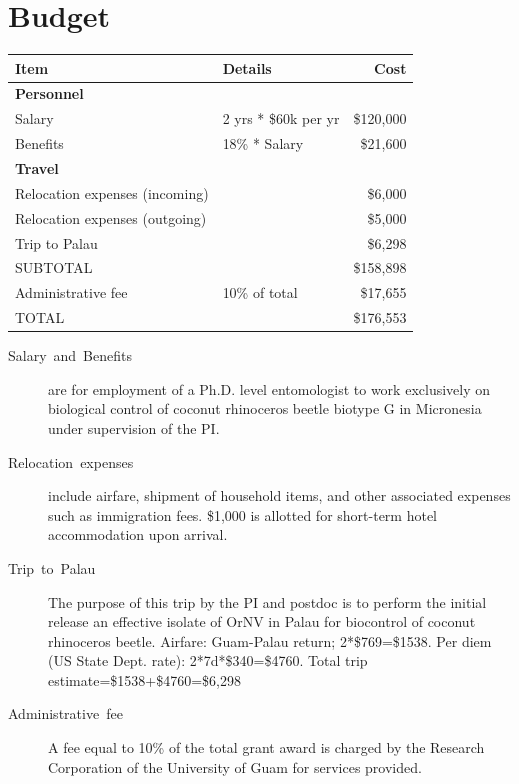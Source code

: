 \documentclass[12pt,letterpaper,english,bibliography=totocnumbered, abstract=on]{scrartcl}
\begin{document}
\section{Budget}
\begin{flushleft}
\begin{tabular}{llr}
\hline 
\textbf{Item} & \textbf{Details} & \textbf{Cost}\tabularnewline
\hline 
\textbf{Personnel} &  & \tabularnewline
Salary & 2 yrs {*} \$60k per yr & \$120,000\tabularnewline
Benefits & 18\% {*} Salary & \$21,600\tabularnewline
\textbf{Travel} &  & \tabularnewline
Relocation expenses (incoming) &  & \$6,000\tabularnewline
Relocation expenses (outgoing) &  & \$5,000\tabularnewline
Trip to Palau &  & \$6,298\tabularnewline
\hline 
SUBTOTAL &  & \$158,898\tabularnewline
Administrative fee & 10\% of total & \$17,655\tabularnewline
\hline 
TOTAL &  & \$176,553\tabularnewline
\hline 
\end{tabular} 
\par\end{flushleft}
\begin{description}
\item [{Salary~and~Benefits}] are for employment of a Ph.D. level entomologist
to work exclusively on biological control of coconut rhinoceros beetle
biotype G in Micronesia under supervision of the PI.
\item [{Relocation~expenses}] include airfare, shipment of household items,
and other associated expenses such as immigration fees. \$1,000 is
allotted for short-term hotel accommodation upon arrival.
\item [{Trip~to~Palau}] The purpose of this trip by the PI and postdoc
is to perform the initial release an effective isolate of OrNV in
Palau for biocontrol of coconut rhinoceros beetle. Airfare: Guam-Palau
return; 2{*}\$769=\$1538. Per diem (US State Dept. rate): 2{*}7d{*}\$340=\$4760.
Total trip estimate=\$1538+\$4760=\$6,298
\item [{Administrative~fee}] A fee equal to 10\% of the total grant award
is charged by the Research Corporation of the University of Guam for
services provided.
\end{description}

\printbibliography

\newpage{}

%

\newpage{}

\appendix
\end{document}
